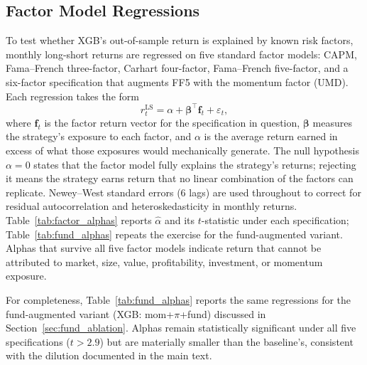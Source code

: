 \subsection{Factor Model Regressions}\label{app:factor_alphas}

To test whether XGB's out-of-sample return is explained by known risk factors, monthly long-short returns are regressed on five standard factor models: CAPM, Fama--French three-factor, Carhart four-factor, Fama--French five-factor, and a six-factor specification that augments FF5 with the momentum factor (UMD). Each regression takes the form
\begin{equation}
r_t^{\text{LS}} = \alpha + \boldsymbol{\beta}^\top \mathbf{f}_t + \varepsilon_t,
\label{eq:factor_regression}
\end{equation}
where $\mathbf{f}_t$ is the factor return vector for the specification in question, $\boldsymbol{\beta}$ measures the strategy's exposure to each factor, and $\alpha$ is the average return earned in excess of what those exposures would mechanically generate. The null hypothesis $\alpha = 0$ states that the factor model fully explains the strategy's returns; rejecting it means the strategy earns return that no linear combination of the factors can replicate. Newey--West standard errors (6 lags) are used throughout to correct for residual autocorrelation and heteroskedasticity in monthly returns. Table~\ref{tab:factor_alphas} reports $\hat\alpha$ and its $t$-statistic under each specification; Table~\ref{tab:fund_alphas} repeats the exercise for the fund-augmented variant. Alphas that survive all five factor models indicate return that cannot be attributed to market, size, value, profitability, investment, or momentum exposure.



For completeness, Table~\ref{tab:fund_alphas} reports the same regressions for the fund-augmented variant (XGB: mom+$\pi$+fund) discussed in Section~\ref{sec:fund_ablation}. Alphas remain statistically significant under all five specifications ($t > 2.9$) but are materially smaller than the baseline's, consistent with the dilution documented in the main text.



